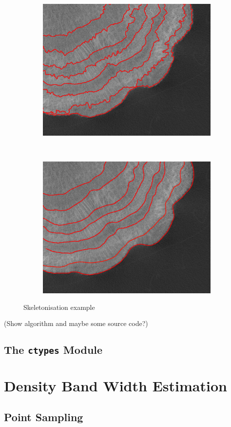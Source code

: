 \begin{figure}[t]
    \centering
    \begin{subfigure}[t]{0.49\textwidth}
        \centering
        \includegraphics[width=1\textwidth, valign=c]{images/rough-label.png}
    \end{subfigure}
    ~
    \begin{subfigure}[t]{0.49\textwidth}
        \centering
        \includegraphics[width=1\textwidth, valign=c]{images/smooth-label.png}
    \end{subfigure}
    \caption{Skeletonisation example}
    \label{fig:skeletonisation}
\end{figure}

(Show algorithm and maybe some source code?)

\subsection{The \texttt{ctypes} Module}

\newpage

\section{Density Band Width Estimation}

\subsection{Point Sampling}